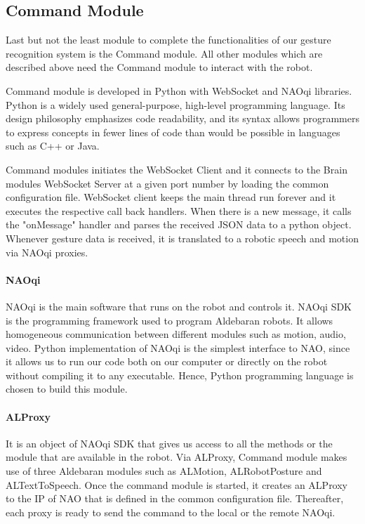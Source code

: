 \subsection{Command Module} Last but not the least module to complete the functionalities of our gesture recognition system is the Command module. All other modules which are described above need the Command module to interact with the robot.

Command module is developed in Python with WebSocket and NAOqi libraries. Python is a widely used general-purpose, high-level programming language. Its design philosophy emphasizes code readability, and its syntax allows programmers to express concepts in fewer lines of code than would be possible in languages such as C++ or Java. 

Command modules initiates the WebSocket Client and it connects to the Brain modules WebSocket Server at a given port number by loading the common configuration file. WebSocket client keeps the main thread run forever and it executes the respective call back handlers. When there is a new message, it calls the "onMessage" handler and parses the received JSON data to a python object. Whenever gesture data is received, it is translated to a robotic speech and motion via NAOqi proxies.

\paragraph*{NAOqi} NAOqi is the main software that runs on the robot and controls it. NAOqi SDK is the programming framework used to program Aldebaran robots.  It allows homogeneous communication between different modules such as motion, audio, video. Python implementation of NAOqi is the simplest interface to NAO, since it allows us to run our code both on our computer or directly on the robot without compiling it to any executable. Hence, Python programming language is chosen to build this module. 

\paragraph*{ALProxy} It is an object of NAOqi SDK that gives us access to all the methods or the module that are available in the robot. Via ALProxy, Command module makes use of three Aldebaran modules such as ALMotion, ALRobotPosture and ALTextToSpeech. Once the command module is started, it creates an ALProxy to the IP of NAO that is defined in the common configuration file. Thereafter, each proxy is ready to send the command to the local or the remote NAOqi.

